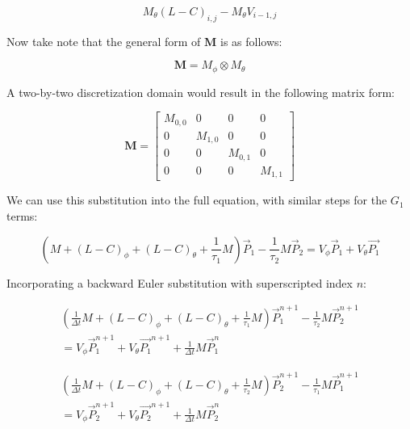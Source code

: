 \documentclass[12pt,a4paper,pagesize=pdftex]{scrartcl}
\begin{document}
{\begin{equation*}
    M_\theta \left(L - C\right)_{i,j} - M_\theta V_{i-1,j}
\end{equation*}

Now take note that the general form of \(\mathbf{M}\) is as follows:

\begin{equation*}
    \mathbf{M} = M_\phi \otimes M_\theta
\end{equation*}

A two-by-two discretization domain would result in the following matrix form:

\begin{equation*}
    \mathbf{M} =
    \begin{bmatrix}
        M_{0,0} & 0 & 0 & 0 \\
        0 & M_{1,0} & 0 & 0 \\
        0 & 0 & M_{0,1} & 0 \\
        0 & 0 & 0 & M_{1,1}
    \end{bmatrix}
\end{equation*}

We can use this substitution into the full equation, with similar steps for the \(G_1\) terms:

\begin{equation*}
    \left(M + \left(L - C\right)_\phi + \left(L - C\right)_\theta + \frac{1}{\tau_1}M\right) \vec{P}_1 - \frac{1}{\tau_2}M \vec{P}_2 = V_\phi \vec{P}_1 + V_\theta \vec{P_1}
\end{equation*}

Incorporating a backward Euler substitution with superscripted index \(n\):

\begin{multline*}
    \left(\frac{1}{\Delta t} M + \left(L - C\right)_\phi + \left(L - C\right)_\theta + \frac{1}{\tau_1} M\right) \vec{P}_1^{n+1} - \frac{1}{\tau_2}M \vec{P}_2^{n+1} \\= V_\phi \vec{P}_1^{n+1} + V_\theta \vec{P_1}^{n+1} + \frac{1}{\Delta t} M \vec{P}_1^{n}
\end{multline*}

\begin{multline*}
    \left(\frac{1}{\Delta t} M + \left(L - C\right)_\phi + \left(L - C\right)_\theta + \frac{1}{\tau_2} M\right) \vec{P}_2^{n+1} - \frac{1}{\tau_1}M \vec{P}_1^{n+1} \\= V_\phi \vec{P}_2^{n+1} + V_\theta \vec{P_2}^{n+1} + \frac{1}{\Delta t} M \vec{P}_2^{n}
\end{multline*}

}
\end{document}
